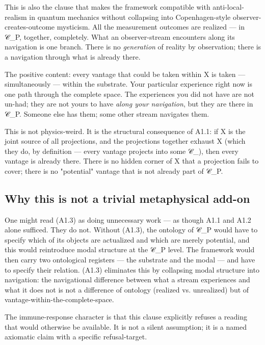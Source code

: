 \documentclass[11pt, openany]{book}
\begin{document}
This is also the clause that makes the framework compatible with anti-local-realism in quantum mechanics without collapsing into Copenhagen-style observer-creates-outcome mysticism. All the measurement outcomes are realized --- in 𝒞\_\allowbreak{}P, together, completely. What an observer-stream encounters along its navigation is one branch. There is no \textit{generation} of reality by observation; there is a navigation through what is already there.

The positive content: every vantage that could be taken within X is taken --- simultaneously --- within the substrate. Your particular experience right now is one path through the complete space. The experiences you did not have are not un-had; they are not yours to have \textit{along your navigation}, but they are there in 𝒞\_\allowbreak{}P. Someone else has them; some other stream navigates them.

This is not physics-weird. It is the structural consequence of A1.1: if X is the joint source of all projections, and the projections together exhaust X (which they do, by definition --- every vantage projects into some 𝒞\_), then every vantage is already there. There is no hidden corner of X that a projection fails to cover; there is no "potential" vantage that is not already part of 𝒞\_\allowbreak{}P.

\subsection{Why this is not a trivial metaphysical add-on}

One might read (A1.3) as doing unnecessary work --- as though A1.1 and A1.2 alone sufficed. They do not. Without (A1.3), the ontology of 𝒞\_\allowbreak{}P would have to specify which of its objects are actualized and which are merely potential, and this would reintroduce modal structure at the 𝒞\_\allowbreak{}P level. The framework would then carry two ontological registers --- the substrate and the modal --- and have to specify their relation. (A1.3) eliminates this by collapsing modal structure into navigation: the navigational difference between what a stream experiences and what it does not is not a difference of ontology (realized vs. unrealized) but of vantage-within-the-complete-space.

The immune-response character is that this clause explicitly refuses a reading that would otherwise be available. It is not a silent assumption; it is a named axiomatic claim with a specific refusal-target.
\end{document}

